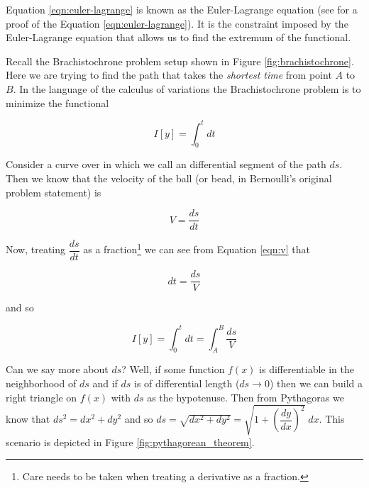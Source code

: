 \documentclass{article}
\theoremstyle{definition}
\begin{document}
\bigskip
\noindent
Equation \ref{eqn:euler-lagrange} is known as the Euler-Lagrange
equation (see \cite{notes:pola} for a proof of the Equation
\ref{eqn:euler-lagrange}). It is the constraint imposed by the
Euler-Lagrange equation that allows us to find the extremum of
the functional.



\bigskip
\noindent
Recall the Brachistochrone problem setup shown in Figure
\ref{fig:brachistochrone}.  Here we are trying to find the path
that takes the \emph{shortest time} from point $A$ to $B$. In the
language of the calculus of variations \cite{wiki:cov} the
Brachistochrone problem is to minimize the functional

\begin{equation*}
I[y] = \int_{0}^{t} dt
\end{equation*}

\bigskip
\noindent
Consider a curve over in which we call an differential segment of
the path $ds$. Then we know that the velocity of the ball (or
bead, in Bernoulli's original problem statement) is

\begin{equation}
V = \dfrac{ds}{dt}
\label{eqn:v}
\end{equation}

\bigskip
\noindent
Now, treating $\dfrac{ds}{dt}$ as a fraction\footnote{Care needs
to be taken when treating a derivative as a fraction.} we can see
from Equation \ref{eqn:v} that

\bigskip
\begin{equation*}
dt = \dfrac{ds}{V}
\end{equation*}

\bigskip
\noindent
and so 

\begin{equation}
I[y] = \int_{0}^{t} dt = \int_A^B \dfrac{ds}{V}
\label{eqn:I}
\end{equation}


\bigskip
{ 
\noindent
Can we say more about $ds$? Well, if some function $f(x)$ is
differentiable in the neighborhood of $ds$ and if $ds$ is of
differential length ($ds \to 0$) then we can build a right
triangle on $f(x)$ with $ds$ as the hypotenuse. Then from
Pythagoras we know that $ds^2 = dx^2 + dy^2$ and so $ds =
\sqrt{dx^2 + dy^2} = \sqrt{1 + \left ( \dfrac{dy}{dx} \right )^2}
\; dx$.  This scenario is depicted in Figure
\ref{fig:pythagorean_theorem}.  \par}
\end{document}
